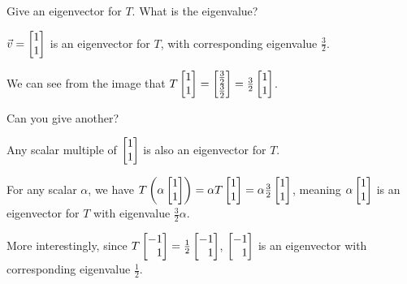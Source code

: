 \documentclass{problemset}
\begin{document}
	\begin{parts}
		\item Give an eigenvector for $T$. What is the eigenvalue?
			\begin{solution}
				$\vec v=\mat{1\\1}$ is an eigenvector for $T$, with corresponding
				eigenvalue $\frac{3}{2}$.

				We can see from the image that
				$T\mat{1\\1}=\mat{\frac{3}{2}\\\frac{3}{2}}=\frac{3}{2}\mat{1\\1}$.
			\end{solution}
		\item Can you give another?
			\begin{solution}
				Any scalar multiple of $\mat{1\\1}$ is also an eigenvector for $T$.

				For any scalar $\alpha$, we have
				$T\left(\alpha\mat{1\\1}\right)=\alpha T\mat{1\\1}=\alpha\frac{3}{2}\mat{1\\1}$,
				meaning $\alpha\mat{1\\1}$ is an eigenvector for $T$ with
				eigenvalue $\frac{3}{2}\alpha$.

				More interestingly, since $T\mat{-1\\1}=\frac{1}{2}\mat{-1\\1}$,
				$\mat{-1\\1}$ is an eigenvector with corresponding eigenvalue
				$\frac{1}{2}$.
			\end{solution}
	\end{parts}
\end{document}

